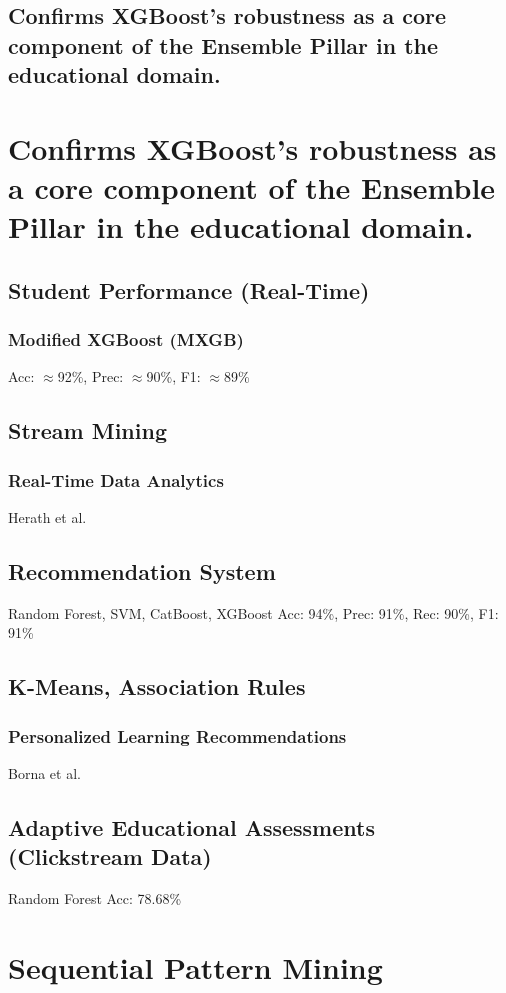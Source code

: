 \documentclass[twocolumn]{svjour3}
\begin{document}
\subsection{Confirms XGBoost's robustness as a core component of the Ensemble Pillar in the educational domain.}

\section{Confirms XGBoost's robustness as a core component of the Ensemble Pillar in the educational domain.}
\subsection{Student Performance (Real-Time)}
\subsubsection{Modified XGBoost (MXGB)}
Acc: \textbf{$\approx$}92\%, Prec: \textbf{$\approx$}90\%, F1: \textbf{$\approx$}89\%
\subsection{Stream Mining}
\subsubsection{Real-Time Data Analytics}
Herath et al. \cite{Herath et al. [21]}
\subsection{Recommendation System}
Random Forest, SVM, CatBoost, XGBoost
Acc: 94\%, Prec: 91\%, Rec: 90\%, F1: 91\%
\subsection{K-Means, Association Rules}
\subsubsection{Personalized Learning Recommendations}
Borna et al. \cite{Borna et al. [22]}
\subsection{Adaptive Educational Assessments (Clickstream Data)}
Random Forest
Acc: 78.68\%

\section{Sequential Pattern Mining}
\end{document}
